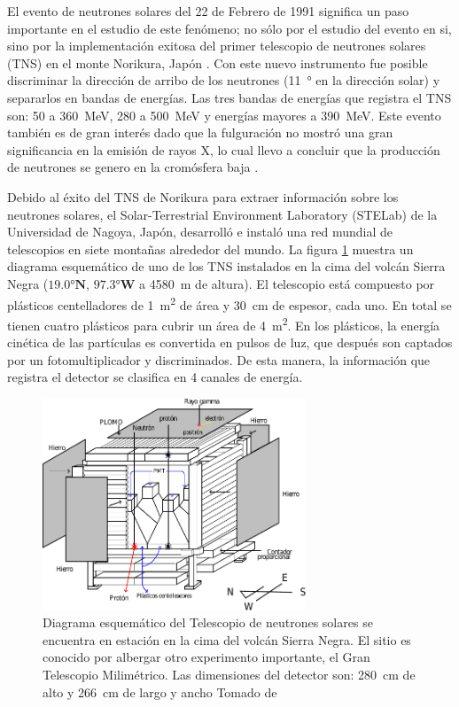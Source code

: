 El evento de neutrones solares del \num{22} de Febrero de \num{1991} significa un paso importante en el estudio de este fenómeno; no sólo por el estudio del evento en si, sino por la implementación exitosa del primer telescopio de neutrones solares (TNS) en el monte Norikura, Japón \cite{muraki92}. Con este nuevo instrumento fue posible discriminar la dirección de arribo de los neutrones (\SI{11}{\degree} en la dirección solar) y separarlos en bandas de energías. Las tres bandas de energías que registra el TNS son: \num{50} a \SI{360}{\mega\electronvolt}, \num{280} a \SI{500}{\mega\electronvolt} y energías mayores a \SI{390}{\mega\electronvolt}. Este evento también es de gran interés dado que la fulguración no mostró una gran significancia en la emisión de rayos X, lo cual llevo a concluir que la producción de neutrones se genero en la cromósfera baja \cite{muraki91}.

Debido al éxito del TNS de Norikura para extraer información sobre los neutrones solares, el Solar-Terrestrial Environment Laboratory (STELab) de la Universidad de Nagoya, Japón, desarrolló e instaló una red mundial de telescopios en siete montañas alrededor del mundo. La figura \ref{fig:tns-mexico} muestra un diagrama esquemático de uno de los TNS instalados en la cima del volcán Sierra Negra ($\ang{19.0}\mathbf{N}$, $\ang{97.3}\mathbf{W}$ a \SI{4580}{\metre} de altura). El telescopio está compuesto por plásticos centelladores de \SI{1}{\square\metre} de área y \SI{30}{\centi\metre} de espesor, cada uno. En total se tienen cuatro plásticos para cubrir un área de \SI{4}{\square\metre}. En los plásticos, la energía cinética de las partículas es convertida en pulsos de luz, que después son captados por un fotomultiplicador y discriminados. De esta manera, la información que registra el detector se clasifica en \num{4} canales de energía\cite{valdes04}.

\begin{figure}
        \centering
        \includegraphics[width=0.7\textwidth]{tns-mexico.pdf}
        \caption{Diagrama esquemático del Telescopio de neutrones solares se encuentra en estación en la cima del volcán Sierra Negra. El sitio es conocido por albergar otro experimento importante, el Gran Telescopio Milimétrico. Las dimensiones del detector son: \SI{280}{\centi\metre} de alto y \SI{266}{\centi\metre} de largo y ancho Tomado de \cite{barrantes18}}
        \label{fig:tns-mexico}
\end{figure}

